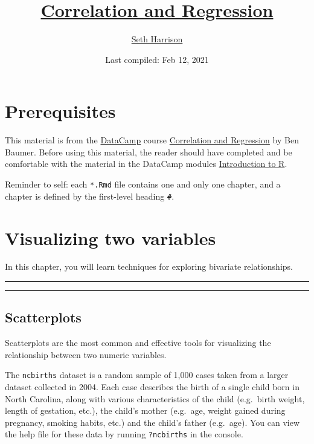 \documentclass[
]{book}
\title{\href{https://www.datacamp.com/courses/correlation-and-regression}{Correlation and Regression}}
\author{\href{https://username.github.io/}{Seth Harrison}}
\date{Last compiled: Feb 12, 2021}
\begin{document}
\maketitle

{
\setcounter{tocdepth}{1}
\tableofcontents
}
\hypertarget{prerequisites}{%
\chapter{Prerequisites}\label{prerequisites}}

This material is from the \href{https://www.datacamp.com}{DataCamp} course \href{https://www.datacamp.com/courses/correlation-and-regression}{Correlation and Regression} by Ben Baumer. Before using this material, the reader should have completed and be comfortable with the material in the DataCamp modules \href{https://www.datacamp.com/courses/free-introduction-to-r}{Introduction to R}.

Reminder to self: each \texttt{*.Rmd} file contains one and only one chapter, and a chapter is defined by the first-level heading \texttt{\#}.

\hypertarget{visualizing-two-variables}{%
\chapter{Visualizing two variables}\label{visualizing-two-variables}}

In this chapter, you will learn techniques for exploring bivariate relationships.

\begin{center}\rule{0.5\linewidth}{0.5pt}\end{center}

\begin{center}\rule{0.5\linewidth}{0.5pt}\end{center}

\hypertarget{scatterplots}{%
\section{Scatterplots}\label{scatterplots}}

Scatterplots are the most common and effective tools for visualizing the relationship between two numeric variables.

The \texttt{ncbirths} dataset is a random sample of 1,000 cases taken from a larger dataset collected in 2004. Each case describes the birth of a single child born in North Carolina, along with various characteristics of the child (e.g.~birth weight, length of gestation, etc.), the child's mother (e.g.~age, weight gained during pregnancy, smoking habits, etc.) and the child's father (e.g.~age). You can view the help file for these data by running \texttt{?ncbirths} in the console.
\end{document}
